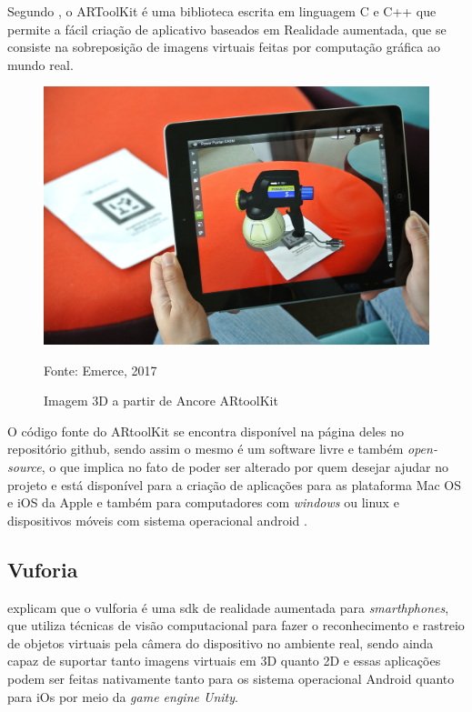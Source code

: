 		Segundo , o ARToolKit é uma biblioteca escrita em linguagem C e C++ que permite a fácil criação de aplicativo baseados em Realidade aumentada, que se consiste na sobreposição de imagens virtuais feitas por computação gráfica ao mundo real.
		
		\begin{figure}[H]
			\centering
			\includegraphics[scale=0.4]{imagens/artoolkit}
			\caption{Imagem 3D a partir de Ancore ARtoolKit}
			Fonte: Emerce, 2017
			\label{fig:artoolkit}
		\end{figure}
		
		O código fonte do ARtoolKit se encontra disponível na página deles no repositório github, sendo assim o mesmo é um software livre e também \textit{open-source}, o que implica no fato de poder ser alterado por quem desejar ajudar no projeto e está disponível para a criação de aplicações para as plataforma Mac OS e iOS da Apple e também para computadores com \textit{windows} ou linux e dispositivos móveis com sistema operacional android \cite{faganholi}.
	\subsection{Vuforia}
		 explicam que o vulforia  é uma sdk de realidade aumentada para \textit{smarthphones}, que utiliza técnicas de visão computacional para fazer o reconhecimento e rastreio de objetos virtuais pela câmera do dispositivo no ambiente real, sendo ainda capaz de suportar tanto imagens virtuais em 3D quanto 2D e essas aplicações podem ser feitas nativamente tanto para os sistema operacional Android quanto para iOs por meio da \textit{game engine Unity}.
		
